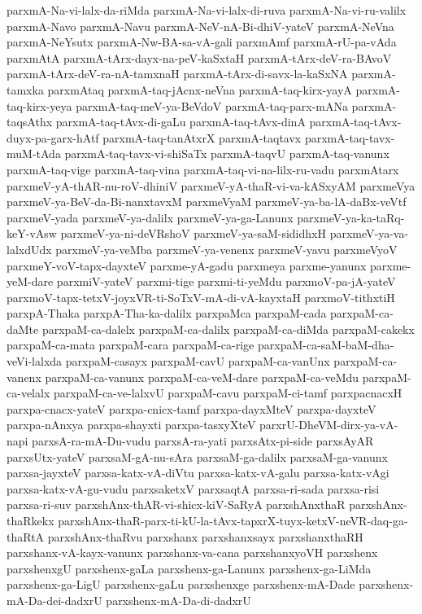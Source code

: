 {parxmA-Na-vi-lalx-da-riMda
parxmA-Na-vi-lalx-di-ruva
parxmA-Na-vi-ru-valilx
parxmA-Navo
parxmA-Navu
parxmA-NeV-nA-Bi-dhiV-yateV
parxmA-NeVna
parxmA-NeYsutx
parxmA-Nw-BA-sa-vA-gali
parxmAmf
parxmA-rU-pa-vAda
parxmAtA
parxmA-tArx-dayx-na-peV-kaSxtaH
parxmA-tArx-deV-ra-BAvoV
parxmA-tArx-deV-ra-nA-tamxnaH
parxmA-tArx-di-savx-la-kaSxNA
parxmA-tamxka
parxmAtaq
parxmA-taq-jAcnx-neVna
parxmA-taq-kirx-yayA
parxmA-taq-kirx-yeya
parxmA-taq-meV-ya-BeVdoV
parxmA-taq-parx-mANa
parxmA-taqsAthx
parxmA-taq-tAvx-di-gaLu
parxmA-taq-tAvx-dinA
parxmA-taq-tAvx-duyx-pa-garx-hAtf
parxmA-taq-tanAtxrX
parxmA-taqtavx
parxmA-taq-tavx-muM-tAda
parxmA-taq-tavx-vi-shiSaTx
parxmA-taqvU
parxmA-taq-vanunx
parxmA-taq-vige
parxmA-taq-vina
parxmA-taq-vi-na-lilx-ru-vadu
parxmAtarx
parxmeV-yA-thAR-nu-roV-dhiniV
parxmeV-yA-thaR-vi-va-kASxyAM
parxmeVya
parxmeV-ya-BeV-da-Bi-nanxtavxM
parxmeVyaM
parxmeV-ya-ba-lA-daBx-veVtf
parxmeV-yada
parxmeV-ya-dalilx
parxmeV-ya-ga-Lanunx
parxmeV-ya-ka-taRq-keY-vAsw
parxmeV-ya-ni-deVRshoV
parxmeV-ya-saM-sididhxH
parxmeV-ya-va-lalxdUdx
parxmeV-ya-veMba
parxmeV-ya-venenx
parxmeV-yavu
parxmeVyoV
parxmeY-voV-tapx-dayxteV
parxme-yA-gadu
parxmeya
parxme-yanunx
parxme-yeM-dare
parxmiV-yateV
parxmi-tige
parxmi-ti-yeMdu
parxmoV-pa-jA-yateV
parxmoV-tapx-tetxV-joyxVR-ti-SoTxV-mA-di-vA-kayxtaH
parxmoV-tithxtiH
parxpA-Thaka
parxpA-Tha-ka-dalilx
parxpaMca
parxpaM-cada
parxpaM-ca-daMte
parxpaM-ca-dalelx
parxpaM-ca-dalilx
parxpaM-ca-diMda
parxpaM-cakekx
parxpaM-ca-mata
parxpaM-cara
parxpaM-ca-rige
parxpaM-ca-saM-baM-dha-veVi-lalxda
parxpaM-casayx
parxpaM-cavU
parxpaM-ca-vanUnx
parxpaM-ca-vanenx
parxpaM-ca-vanunx
parxpaM-ca-veM-dare
parxpaM-ca-veMdu
parxpaM-ca-velalx
parxpaM-ca-ve-lalxvU
parxpaM-cavu
parxpaM-ci-tamf
parxpacnacxH
parxpa-cnacx-yateV
parxpa-cnicx-tamf
parxpa-dayxMteV
parxpa-dayxteV
parxpa-nAnxya
parxpa-shayxti
parxpa-tasxyXteV
parxrU-DheVM-dirx-ya-vA-napi
parxsA-ra-mA-Du-vudu
parxsA-ra-yati
parxsAtx-pi-side
parxsAyAR
parxsUtx-yateV
parxsaM-gA-nu-sAra
parxsaM-ga-dalilx
parxsaM-ga-vanunx
parxsa-jayxteV
parxsa-katx-vA-diVtu
parxsa-katx-vA-galu
parxsa-katx-vAgi
parxsa-katx-vA-gu-vudu
parxsaketxV
parxsaqtA
parxsa-ri-sada
parxsa-risi
parxsa-ri-suv
parxshAnx-thAR-vi-shicx-kiV-SaRyA
parxshAnxthaR
parxshAnx-thaRkekx
parxshAnx-thaR-parx-ti-kU-la-tAvx-tapxrX-tuyx-ketxV-neVR-daq-ga-thaRtA
parxshAnx-thaRvu
parxshanx
parxshanxsayx
parxshanxthaRH
parxshanx-vA-kayx-vanunx
parxshanx-va-cana
parxshanxyoVH
parxshenx
parxshenxgU
parxshenx-gaLa
parxshenx-ga-Lanunx
parxshenx-ga-LiMda
parxshenx-ga-LigU
parxshenx-gaLu
parxshenxge
parxshenx-mA-Dade
parxshenx-mA-Da-dei-dadxrU
parxshenx-mA-Da-di-dadxrU
}
